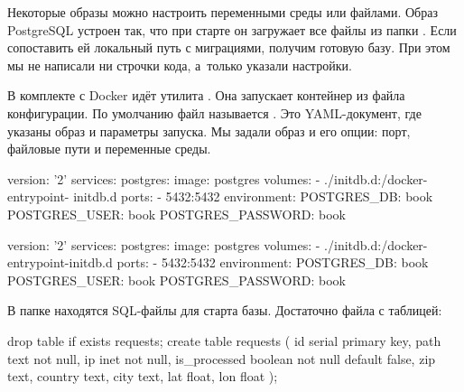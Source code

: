 Некоторые образы можно настроить переменными среды или файлами. Образ PostgreSQL
устроен так, что при старте он загружает все  файлы из папки
. Если сопоставить ей локальный путь с
миграциями, получим готовую базу. При этом мы не написали ни строчки кода,
а~только указали настройки.


В комплекте с Docker идёт утилита . Она запускает
контейнер из файла конфигурации. По умолчанию файл называется
. Это YAML-документ, где указаны образ и параметры
запуска. Мы задали образ  и его опции: порт, файловые пути и
переменные среды.


\ifnarrow

\begin{yaml}
version: '2'
services:
  postgres:
    image: postgres
    volumes:
      - ./initdb.d:/docker-entrypoint-
                                initdb.d
    ports:
      - 5432:5432
    environment:
      POSTGRES_DB: book
      POSTGRES_USER: book
      POSTGRES_PASSWORD: book
\end{yaml}

\else

\begin{yaml}
version: '2'
services:
  postgres:
    image: postgres
    volumes:
      - ./initdb.d:/docker-entrypoint-initdb.d
    ports:
      - 5432:5432
    environment:
      POSTGRES_DB: book
      POSTGRES_USER: book
      POSTGRES_PASSWORD: book
\end{yaml}

\fi

В папке  находятся SQL-файлы для старта базы. Достаточно файла
 с таблицей:


\ifnarrow

\begin{sql}
drop table if exists requests;
create table requests (
    id            serial primary key,
    path          text not null,
    ip            inet not null,
    is_processed  boolean not null
                  default false,
    zip           text,
    country       text,
    city          text,
    lat           float,
    lon           float
);
\end{sql}

\else

